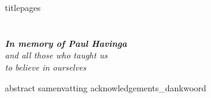 \frontmatter


{titlepages}

\chapter*{}

\vspace{3cm}

\begin{center}
\textsl{\textbf{\textit{\Large In memory of Paul Havinga}}}\\
{\textit{\Large and all those who taught us}}\\    
{\textit{\Large to believe in ourselves}}\\    
\end{center}





\setcounter{page}{7}

{abstract}
\glsresetall
{samenvatting}
{acknowledgements_dankwoord}